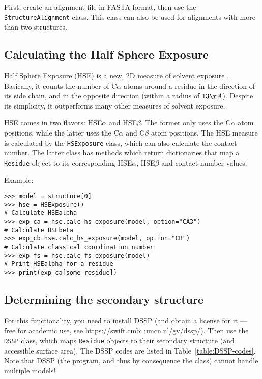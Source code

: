 First, create an alignment file in FASTA format, then use the \texttt{StructureAlignment}
class. This class can also be used for alignments with more than two
structures.

\subsection{Calculating the Half Sphere Exposure}

Half Sphere Exposure (HSE) is a new, 2D measure of solvent exposure
\cite{hamelryck2005}.
Basically, it counts the number of C$\alpha$ atoms around a residue
in the direction of its side chain, and in the opposite direction
(within a radius of $13 \AA$). Despite its simplicity, it outperforms
many other measures of solvent exposure.

HSE comes in two flavors: HSE$\alpha$ and HSE$\beta$. The former
only uses the C$\alpha$ atom positions, while the latter uses the
C$\alpha$ and C$\beta$ atom positions. The HSE measure is calculated
by the \texttt{HSExposure} class, which can also calculate the contact
number. The latter class has methods which return dictionaries that
map a \texttt{Residue} object to its corresponding HSE$\alpha$, HSE$\beta$
and contact number values.

Example:

\begin{verbatim}
>>> model = structure[0]
>>> hse = HSExposure()
# Calculate HSEalpha
>>> exp_ca = hse.calc_hs_exposure(model, option="CA3")
# Calculate HSEbeta
>>> exp_cb=hse.calc_hs_exposure(model, option="CB")
# Calculate classical coordination number
>>> exp_fs = hse.calc_fs_exposure(model)
# Print HSEalpha for a residue
>>> print(exp_ca[some_residue])
\end{verbatim}

\subsection{Determining the secondary structure}

For this functionality, you need to install DSSP (and obtain a license
for it --- free for academic use, see \url{https://swift.cmbi.umcn.nl/gv/dssp/}).
Then use the \texttt{DSSP} class, which maps \texttt{Residue} objects
to their secondary structure (and accessible surface area). The DSSP
codes are listed in Table~\ref{table:DSSP-codes}. Note that DSSP (the
program, and thus by consequence the class) cannot handle multiple
models!

